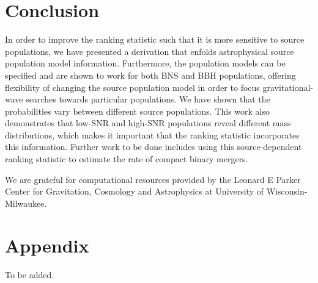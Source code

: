 \documentclass[twocolumn,showpacs,unsortedaddress,superscriptaddress,showkeys,nofootinbib,preprintnumbers,letterpaper]{revtex4-1}
\begin{document}

\section{Conclusion} \label{sec:conclusion}

In order to improve the ranking statistic such that it is more sensitive to source populations, we have presented a derivation that enfolds astrophysical source population model information. Furthermore, the population models can be specified and are shown to work for both BNS and BBH populations, offering flexibility of changing the source population model in order to focus gravitational-wave searches towards particular populations. We have shown that the probabilities vary between different source populations. This work also demonstrates that low-SNR and high-SNR populations reveal different mass distributions, which makes it important that the ranking statistic incorporates this information. Further work to be done includes using this source-dependent ranking statistic to estimate the rate of compact binary mergers.

\acknowledgments

We are grateful for computational resources provided by the Leonard E Parker
Center for Gravitation, Cosmology and Astrophysics at University of
Wisconsin-Milwaukee.

\appendix

\section{Appendix}
\label{appendix2}

To be added.


\end{document}
